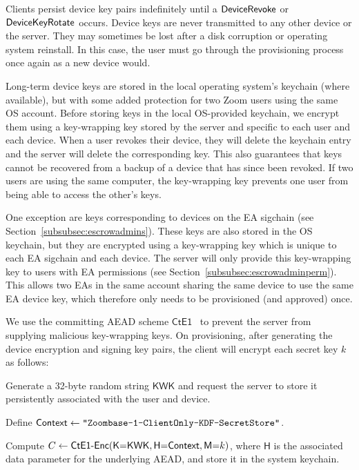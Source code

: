 Clients persist device key pairs indefinitely until a $\mathsf{DeviceRevoke}{}$ or $\mathsf{DeviceKeyRotate}{}$
occurs. Device keys are never transmitted to any other device or the server. They may sometimes be
lost after a disk corruption or operating system reinstall. In this case, the user must go through
the provisioning process once again as a new device would.

Long-term device keys are stored in the local operating system's keychain (where available), but
with some added protection for two Zoom users using the same OS account.
%
Before storing keys in the local OS-provided keychain, we encrypt them using a key-wrapping key
stored by the server and specific to each user and each device. 
%
When a user revokes their device, they will delete the keychain entry and the server will delete the
corresponding key. This also guarantees that keys cannot be recovered from a backup of a device that
has since been revoked.
%
If two users are using the same computer, the key-wrapping key prevents one user from being able to
access the other's keys. 

One exception are keys corresponding to devices on the EA sigchain (see
Section~\ref{subsubsec:escrowadmins}). These keys are also stored in the OS keychain, but they are
encrypted using a key-wrapping key which is unique to each EA sigchain and each device. The server
will only provide this key-wrapping key to users with EA permissions (see
Section~\ref{subsubsec:escrowadminperm}). This allows two EAs in the same account sharing the same
device to use the same EA device key, which therefore only needs to be provisioned (and approved)
once.

We use the committing AEAD scheme $\mathsf{CtE1}$~\cite{messagefranking} to prevent the server from
supplying malicious key-wrapping keys.
%
On provisioning, after generating the device encryption and signing key pairs, the client will
encrypt each secret key $k$ as follows:
\begingroup
\RaggedRight
\begin{enumerate*}
\item Generate a 32-byte random string $\mathsf{KWK}$ and request the server to store it
persistently associated with the user and device.
\item Define ${\sf Context} \leftarrow \texttt{"Zoombase-1-ClientOnly-KDF-SecretStore"}$.
\item Compute $C \leftarrow \textsf{CtE1-Enc}(\textsf{K}{=}\textsf{KWK}, \textsf{H}{=}{\sf Context},
\textsf{M}{=}k)$, where $\textsf{H}$ is the associated data parameter for the underlying AEAD, and
store it in the system keychain.
\end{enumerate*}
\endgroup

